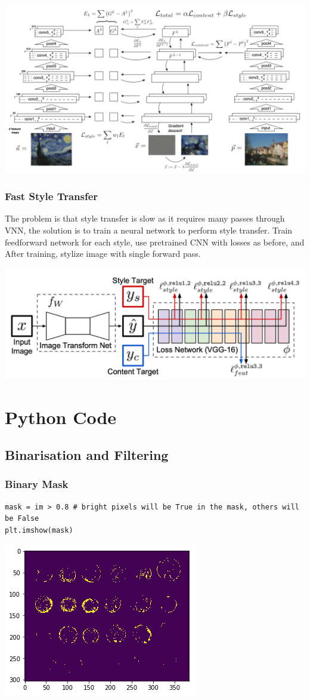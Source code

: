 \documentclass[x11names,11pt,a4paper]{article}
\theoremstyle{definition}
\begin{document}
\begin{center}
	\includegraphics[width=0.8\linewidth]{img/conditional_GAN_style_representation.png}
\end{center}

\subsubsection{Fast Style Transfer}
The problem is that style transfer is slow as it requires many passes through VNN, the solution is to train a neural network to perform style transfer. Train feedforward network for each style, use pretrained CNN with losses as before, and After training, stylize image with single forward pass.
\begin{center}
	\includegraphics[width=0.7\linewidth]{img/fast_style_transfer}
\end{center}

\clearpage
\appendix

\section{Python Code}
\subsection{Binarisation and Filtering}
\subsubsection{Binary Mask}
\begin{verbatim}
mask = im > 0.8 # bright pixels will be True in the mask, others will be False 
plt.imshow(mask)
\end{verbatim}
\begin{center}
	\includegraphics[width=0.4\linewidth]{img/BinaryMask.png}
\end{center}
\end{document}
